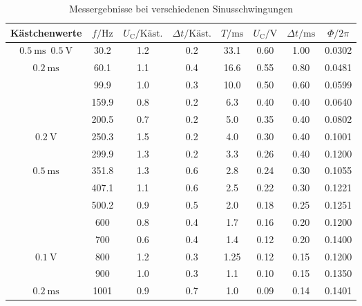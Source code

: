\begin{table}
    \caption{Messergebnisse bei verschiedenen Sinusschwingungen}
    \label{tab:RC_b_c}
    \centering
    \begin{tabular}{
        c
        S[table-format=3.1]
        S
        S
        S[table-format=2.2]
        S[table-format=1.2]
        S[table-format=1.2]
        S[table-format=1.4]
    }
    \toprule
    {Kästchenwerte} & 
    {$f / \unit{\hertz}$} &
    {$U_\text{C} / \text{Käst.}$} &
    {$\Delta t / \text{Käst.}$} &
    {$T / \unit{\milli\s}$} &
    {$U_\text{C} / \unit{\volt} $} & 
    {$\Delta t / \unit{\milli\s}$} &
    {$\Phi / 2 \pi$}\\
    \midrule
           
    $\qty{0.5}{\milli\s}$\, $\qty{0.5}{\volt} $ & 30.2  & 1.2 & 0.2  & 33.1 & 0.60 & 1.00 & 0.0302 \\
    $\qty{0.2}{\milli\s}$                       & 60.1  & 1.1 & 0.4  & 16.6 & 0.55 & 0.80 & 0.0481 \\
                                                & 99.9  & 1.0 & 0.3  & 10.0 & 0.50 & 0.60 & 0.0599 \\
                                                & 159.9 & 0.8 & 0.2  & 6.3  & 0.40 & 0.40 & 0.0640 \\
                                                & 200.5 & 0.7 & 0.2  & 5.0  & 0.35 & 0.40 & 0.0802 \\
    $\qty{0.2}{\volt}$                          & 250.3 & 1.5 & 0.2  & 4.0  & 0.30 & 0.40 & 0.1001 \\
                                                & 299.9 & 1.3 & 0.2  & 3.3  & 0.26 & 0.40 & 0.1200 \\
    $\qty{0.5}{\milli\s}$                       & 351.8 & 1.3 & 0.6  & 2.8  & 0.24 & 0.30 & 0.1055 \\
                                                & 407.1 & 1.1 & 0.6  & 2.5  & 0.22 & 0.30 & 0.1221 \\
                                                & 500.2 & 0.9 & 0.5  & 2.0  & 0.18 & 0.25 & 0.1251 \\
                                                & 600   & 0.8 & 0.4  & 1.7  & 0.16 & 0.20 & 0.1200 \\
                                                & 700   & 0.6 & 0.4  & 1.4  & 0.12 & 0.20 & 0.1400 \\
    $\qty{0.1}{\volt}$                          & 800   & 1.2 & 0.3  & 1.25 & 0.12 & 0.15 & 0.1200 \\
                                                & 900   & 1.0 & 0.3  & 1.1  & 0.10 & 0.15 & 0.1350 \\
    $\qty{0.2}{\milli\s}$                       & 1001  & 0.9 & 0.7  & 1.0  & 0.09 & 0.14 & 0.1401 \\
    \bottomrule
    \end{tabular}
\end{table}